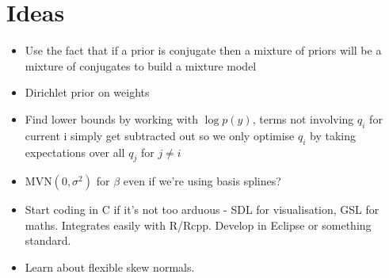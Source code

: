 \documentclass{amsart}
\begin{document}
\section{Ideas}
\begin{itemize}
\item Use the fact that if a prior is conjugate then a mixture of priors will be a mixture of conjugates to build
a mixture model
\item Dirichlet prior on weights
\item Find lower bounds by working with $\log p(y)$, terms not involving $q_i$ for current i simply get subtracted out so
we only optimise $q_i$ by taking expectations over all $q_j$ for $j \ne i$
\item $\text{MVN}(0, \sigma^2)$ for $\beta$ even if we're using basis splines?
\item Start coding in C if it's not too arduous - SDL for visualisation, GSL for maths. Integrates easily with R/Rcpp.
Develop in Eclipse or something standard.
\item Learn about flexible skew normals.
\end{itemize}
\end{document}
